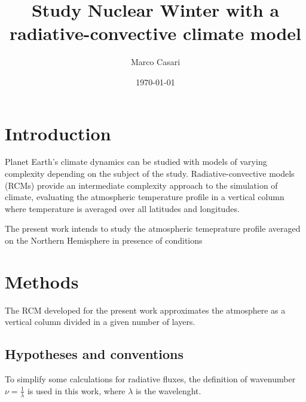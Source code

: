 \documentclass[a4paper,10pt,draft,twocolumn]{article}
\begin{document}
\title{Study Nuclear Winter with a radiative-convective climate model} %
\author{Marco Casari}
\date{\today}
\maketitle

\begin{abstract}
\end{abstract}


\section{Introduction}
Planet Earth's climate dynamics can be studied with models of varying complexity depending on the subject of the study. Radiative-convective models (RCMs) provide an intermediate complexity approach to the simulation of climate, evaluating the atmospheric temperature profile in a vertical column where temperature is averaged over all latitudes and longitudes.

The present work intends to study the atmospheric temeprature profile averaged on the Northern Hemisphere in presence of conditions 


\section{Methods}
The RCM developed for the present work approximates the atmosphere as a vertical column divided in a given number of layers.

\subsection{Hypotheses and conventions}
\label{sec:Hypotheses and conventions}
To simplify some calculations for radiative fluxes, the definition of wavenumber $\nu = \frac{1}{\lambda}$ is used in this work, where $\lambda$ is the wavelenght.
\end{document}
